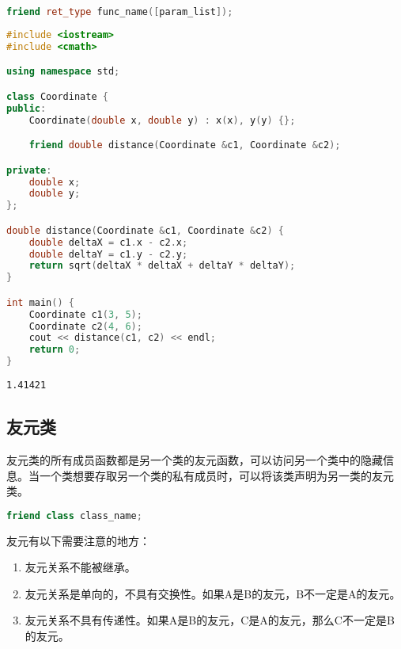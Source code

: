 \begin{lstlisting}[language=C++]
friend ret_type func_name([param_list]);
\end{lstlisting}

\vspace{0.5cm}


\begin{lstlisting}[language=C++]
#include <iostream>
#include <cmath>

using namespace std;

class Coordinate {
public:
    Coordinate(double x, double y) : x(x), y(y) {};

    friend double distance(Coordinate &c1, Coordinate &c2);

private:
    double x;
    double y;
};

double distance(Coordinate &c1, Coordinate &c2) {
    double deltaX = c1.x - c2.x;
    double deltaY = c1.y - c2.y;
    return sqrt(deltaX * deltaX + deltaY * deltaY);
}

int main() {
    Coordinate c1(3, 5);
    Coordinate c2(4, 6);
    cout << distance(c1, c2) << endl;
    return 0;
}
\end{lstlisting}

\begin{tcolorbox}
	\begin{verbatim}
1.41421
	\end{verbatim}
\end{tcolorbox}

\vspace{0.5cm}

\subsection{友元类}

友元类的所有成员函数都是另一个类的友元函数，可以访问另一个类中的隐藏信息。当一个类想要存取另一个类的私有成员时，可以将该类声明为另一类的友元类。

\vspace{-0.5cm}

\begin{lstlisting}[language=C++]
friend class class_name;
\end{lstlisting}

友元有以下需要注意的地方：

\begin{enumerate}
	\item 友元关系不能被继承。
	\item 友元关系是单向的，不具有交换性。如果A是B的友元，B不一定是A的友元。
	\item 友元关系不具有传递性。如果A是B的友元，C是A的友元，那么C不一定是B的友元。
\end{enumerate}

